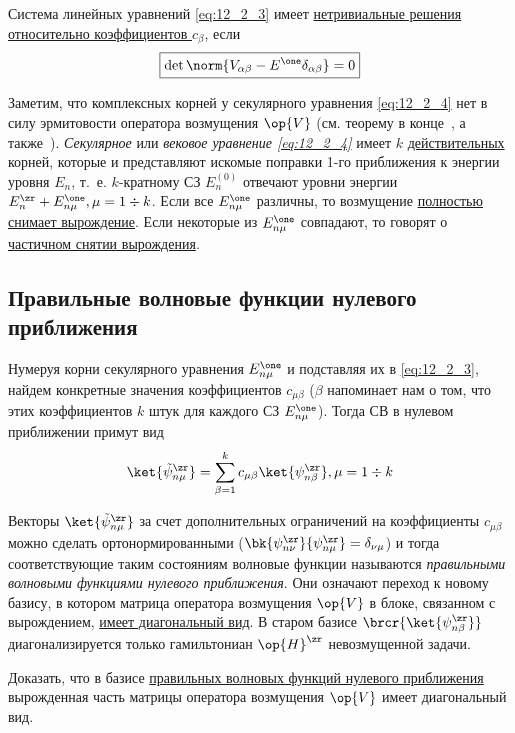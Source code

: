 Система линейных уравнений \eqref{eq:12_2_3} имеет \underline{нетривиальные решения относительно коэффициентов $c_\beta$}, если 
\begin{equation}
\label{eq:12_2_4}
\boxed{\det \norm{V_{\alpha \beta} - E^\one \delta_{\alpha \beta}} = 0}
\end{equation}

Заметим, что комплексных корней у секулярного уравнения \eqref{eq:12_2_4} нет в силу эрмитовости оператора возмущения $\op{V}$  (см. теорему в конце~, а также~). {\em Секулярное} или {\em вековое уравнение \eqref{eq:12_2_4}} имеет $k$ \underline{действительных} корней, которые и представляют искомые поправки 1-го приближения к энергии уровня $E_n$, т.~е. $k$-кратному СЗ $E_n^{(0)}$ отвечают уровни энергии $E_n^\zr + E_{n \mu} ^\one, \mu = 1 \div k$. Если все $E_{n \mu}^\one$ различны, то возмущение \underline{полностью снимает вырождение}. Если некоторые из $E_{n \mu} ^\one$ совпадают, то говорят о \underline{частичном снятии вырождения}.

\subsection{Правильные волновые функции нулевого приближения}

Нумеруя корни секулярного уравнения $E_{n \mu} ^\one$ и подставляя их в \eqref{eq:12_2_3}, найдем конкретные значения коэффициентов
$c_{\mu \beta}$ ($\beta$ напоминает нам о том, что этих коэффициентов $k$ штук для каждого СЗ $E_{n \mu} ^\one$). Тогда СВ в нулевом приближении примут вид
$$
\ket{\tilde{\psi}_{n \mu}^\zr} = \sum_{\beta=1}^k c_{\mu \beta} \ket{\psi_{n \beta}^\zr}, \mu = 1 \div k
$$

Векторы $\ket{\tilde{\psi}_{n \mu}^\zr}$ за счет дополнительных ограничений на коэффициенты $c_{\mu \beta}$ можно сделать ортонормированными ($\bk{\psi_{n \nu}^\zr}{\psi_{n \mu}^\zr} = \delta_{\nu \mu}$) и тогда соответствующие таким состояниям волновые функции называются {\em правильными волновыми функциями нулевого приближения}. Они означают переход к новому базису, в котором матрица оператора возмущения $\op{V}$ в блоке, связанном с вырождением, \underline{имеет диагональный вид}. В старом базисе $\brcr{\ket{\psi_{n \beta} ^\zr}}$ диагонализируется только гамильтониан $\op{H}^\zr$ невозмущенной задачи.

\begin{excr}
Доказать, что в базисе \underline{правильных волновых функций нулевого приближения} вырожденная часть матрицы оператора возмущения $\op{V}$ имеет диагональный вид.
\end{excr}

